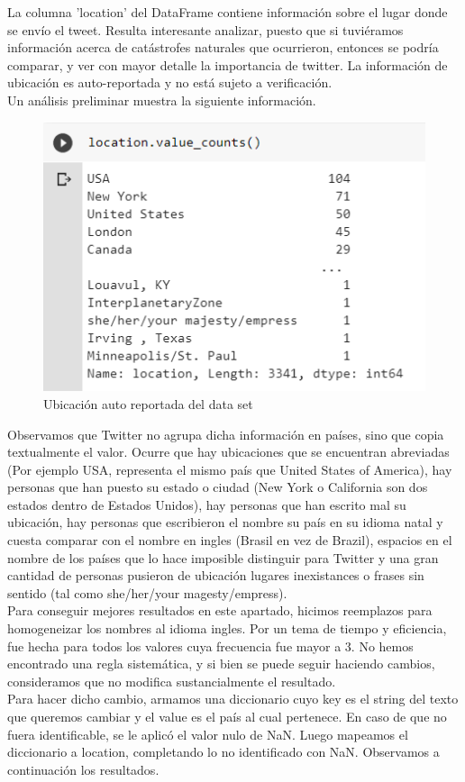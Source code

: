 \documentclass[]{article}
\begin{document}
La columna 'location' del DataFrame contiene informaci\'on sobre el lugar donde se env\'io el tweet. Resulta interesante analizar, puesto que si tuvi\'eramos informaci\'on acerca de cat\'astrofes naturales que ocurrieron, entonces se podr\'ia comparar, y ver con mayor detalle la importancia de twitter. La informaci\'on de ubicaci\'on es auto-reportada y no est\'a sujeto a verificaci\'on. \\

Un an\'alisis preliminar muestra la siguiente informaci\'on.\\
 \begin{figure}[H]
	\centering
	\includegraphics[width=0.75\linewidth]{location}
	\caption[]{Ubicaci\'on auto reportada del data set}
\end{figure}

Observamos que Twitter no agrupa dicha informaci\'on en pa\'ises, sino que copia textualmente el valor. Ocurre que hay ubicaciones que se encuentran abreviadas (Por ejemplo USA, representa el mismo pa\'is que United States of America), hay personas que han puesto su estado o ciudad (New York o California son dos estados dentro de Estados Unidos), hay personas que han escrito mal su ubicaci\'on, hay personas que escribieron el nombre su pa\'is en su idioma natal y cuesta comparar con el nombre en ingles (Brasil en vez de Brazil), espacios en el nombre de los pa\'ises que lo hace imposible distinguir para Twitter y una gran cantidad de personas pusieron de ubicaci\'on lugares inexistances o frases sin sentido (tal como she/her/your magesty/empress). \\
Para conseguir mejores resultados en este apartado, hicimos reemplazos para homogeneizar los nombres al idioma ingles. Por un tema de tiempo y eficiencia, fue hecha para todos los valores cuya frecuencia fue mayor a 3. No hemos encontrado una regla sistem\'atica, y si bien se puede seguir haciendo cambios, consideramos que no modifica sustancialmente el resultado. \\
Para hacer dicho cambio, armamos una diccionario cuyo key es el string del texto que queremos cambiar y el value es el pa\'is al cual pertenece. En caso de que no fuera identificable, se le aplic\'o el valor nulo de NaN. Luego mapeamos el diccionario a location, completando lo no identificado con NaN. Observamos a continuaci\'on los resultados.
\end{document}
